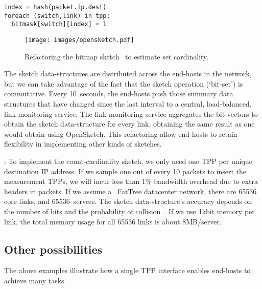 \begin{eext}
\begin{verbatim}
index = hash(packet.ip.dest)
foreach (switch,link) in tpp:
  bitmask[switch][index] = 1
\end{verbatim}

\begin{figure}[t]
\centering
\texttt{[image: images/opensketch.pdf]}
\caption{Refactoring the bitmap sketch~\cite{estan2003bitmap} to estimate set cardinality.}
\label{fig:opensketch}
\end{figure}

The sketch data-structures are distributed across the end-hosts in the
network, but we can take advantage of the fact that the sketch
operation (`bit-set') is commutative.  Every 10~seconds, the end-hosts push
those summary data structures that have changed since the last
interval to a central, load-balanced, link monitoring service.  The
link monitoring service aggregates the bit-vectors to obtain the
sketch data-structure for every link, obtaining the same result as one
would obtain using OpenSketch.  This refactoring allow end-hosts to
retain flexibility in implementing other kinds of sketches.

: To implement the count-cardinality sketch, we
only need one TPP per unique destination IP address.  If we sample one
out of every 10 packets to insert the measurement TPPs, we will incur
less than 1\% bandwidth overhead due to extra headers in packets.  If
we assume a ~FatTree datacenter network, there are 65536 core
links, and 65536~servers.  The sketch data-structure's accuracy depends
on the number of bits and the probability of
collision~\cite{estan2003bitmap}.  If we use 1kbit memory per link,
the total memory usage for all 65536 links is about 8MB/server.
\end{eext}

\subsection{Other possibilities}\label{subsec:otherposs}
The above examples illustrate how a single TPP interface
enables end-hosts to achieve many tasks.  


